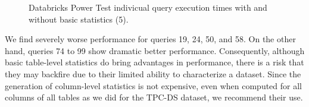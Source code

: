 \begin{figure}
   \begin{center}
   \end{center}
   \caption{Databricks Power Test indivicual query execution times with and without basic statistics (5).}
   \label{fig:additionalResultsDatabricksWithBasicStatsPowerTestIndividualQueries5}
\end{figure}

We find severely worse performance for queries 19, 24, 50, and 58. On the other hand, queries 74 to 99 show dramatic better performance. Consequently, although basic table-level statistics do bring advantages in performance, there is a risk that they may backfire due to their limited ability to characterize a dataset. Since the generation of column-level statistics is not expensive, even when computed for all columns of all tables as we did for the TPC-DS dataset, we recommend their use.

